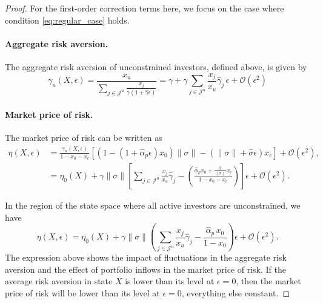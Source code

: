 \begin{proof}
For the first-order correction terms here, we focus on the case where condition \eqref{eq:regular_case} holds. 

\paragraph{Aggregate risk aversion.} The aggregate risk aversion of unconstrained investors, defined above, is given by
\begin{equation}
    \gamma_u(X,\epsilon) = \frac{x_u}{\sum_{j\in\mathcal{J}^u} \frac{x_j}{\gamma (1+\hat{\gamma}\epsilon)}} = \gamma + \gamma \sum_{j\in\mathcal{J}^u} \frac{x_j}{x_u} \hat{\gamma}_j\, \epsilon + \mathcal{O}(\epsilon^2)
\end{equation}

\paragraph{Market price of risk.} The market price of risk can be written as
\begin{align}
    \eta(X,\epsilon) &= \frac{\gamma_u(X,\epsilon)}{1-x_{0} - x_c} \left[ (1-(1+\hat{\alpha}_p \epsilon) x_{0})\|\sigma\| - (\|\sigma\|+\hat{\sigma}\epsilon) x_{c}\right] + \mathcal{O}(\epsilon^2),\nonumber\\
    &= \eta_0(X)+\gamma \|\sigma\| \left[\sum_{j\in\mathcal{J}^u} \frac{x_j}{x_u} \hat{\gamma}_j -\left(\frac{\hat{\alpha}_p  x_0+\frac{\hat{\sigma}}{\|\sigma\|} x_c }{1-x_0-x_c}\right)\right] \epsilon+ \mathcal{O}(\epsilon^2).
\end{align}

In the region of the state space where all active investors are unconstrained, we have
\begin{equation}\label{eq:eta-first-order}
    \eta(X,\epsilon) = \eta_0(X)+\gamma \|\sigma\| \left(\sum_{j\in\mathcal{J}^u} \frac{x_j}{x_u} \hat{\gamma}_j -\frac{\hat{\alpha}_p\,  x_0}{1-x_0}\right) \epsilon+ \mathcal{O}(\epsilon^2).
\end{equation}
The expression above shows the impact of fluctuations in the aggregate risk aversion and the effect of portfolio inflows in the market price of risk. If the average risk aversion in state $X$ is lower than its level at $\epsilon = 0$, %
then the market price of risk will be lower than its level at $\epsilon = 0$, everything else constant. 


\end{proof}

